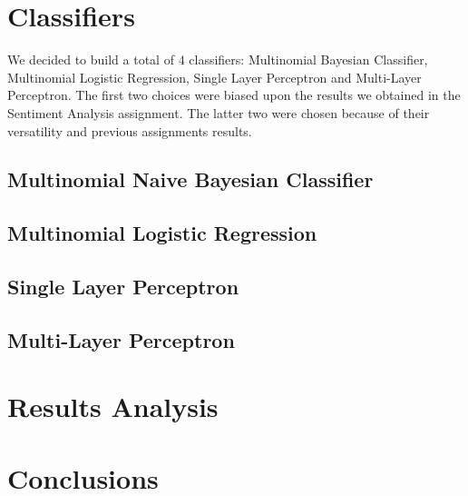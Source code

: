 \documentclass[10pt,a4paper]{report}
\begin{document}
\section{Classifiers}
We decided to build a total of $4$ classifiers: Multinomial Bayesian Classifier, Multinomial Logistic Regression, Single Layer Perceptron and Multi-Layer Perceptron. The first two choices were biased upon the results we obtained in the Sentiment Analysis assignment. The latter two were chosen because of their versatility and previous assignments results.  
\subsection{Multinomial Naive Bayesian Classifier}
\subsection{Multinomial Logistic Regression}
\subsection{Single Layer Perceptron}
\subsection{Multi-Layer Perceptron}
\section{Results Analysis}
\section{Conclusions}
\end{document}
